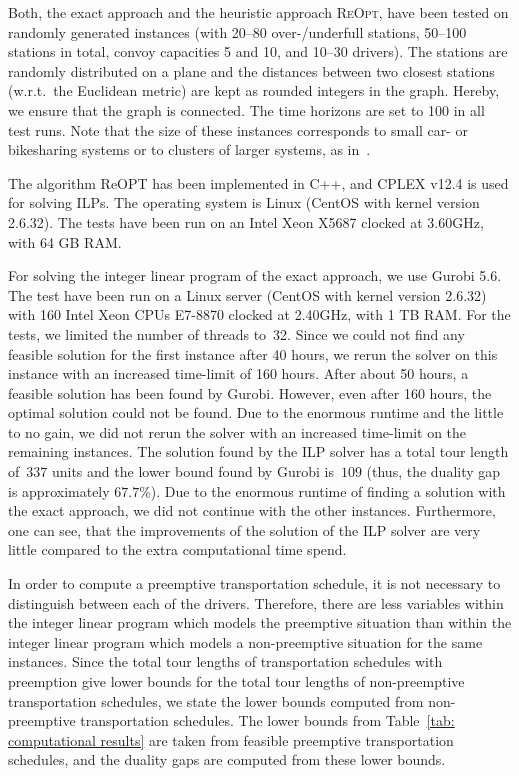 \documentclass[english]{llncs}
\numberwithin{sublemma}{lemma}
\newcommand{\REOPT}{\textsc{ReOpt}\xspace}
\begin{document}
Both, the exact approach and the heuristic approach \REOPT, have been tested on randomly generated instances (with 20--80 over-/underfull stations,
50--100 stations in total, convoy capacities 5 and 10, and 10--30 drivers).
The stations are randomly distributed on a plane and the distances between two closest stations (w.r.t.~the Euclidean metric) are kept as rounded integers in the graph.
Hereby, we ensure that the graph is connected.
The time horizons are set to 100 in all test runs.
Note that the size of these instances corresponds to small car- or bikesharing systems or to clusters of larger systems, as in~\cite{SHH-2013}.


The algorithm ReOPT has been implemented in C++, and CPLEX v12.4 is used for solving ILPs.
The operating system is Linux (CentOS with kernel version 2.6.32).
The tests have been run on an Intel Xeon X5687 clocked at 3.60GHz, with 64 GB RAM.


For solving the integer linear program of the exact approach, we use Gurobi 5.6.
The test have been run on a Linux server (CentOS with kernel version 2.6.32) with 160 Intel Xeon CPUs E7-8870 clocked at 2.40GHz, with 1 TB RAM.
For the tests, we limited the number of threads to~32.
Since we could not find any feasible solution for the first instance after 40 hours, we rerun the solver on this instance with an increased time-limit of 160 hours.
After about 50 hours, a feasible solution has been found by Gurobi.
However, even after 160 hours, the optimal solution could not be found.
Due to the enormous runtime and the little to no gain, we did not rerun the solver with an increased time-limit on the remaining instances.
The solution found by the ILP solver has a total tour length of~$337$ units and the lower bound found by Gurobi is~$109$ (thus, the duality gap is approximately $67.7$\%).
Due to the enormous runtime of finding a solution with the exact approach, we did not continue with the other instances.
Furthermore, one can see, that the improvements of the solution of the ILP solver are very little compared to the extra computational time spend.

In order to compute a preemptive transportation schedule, it is not necessary to distinguish between each of the drivers.
Therefore, there are less variables within the integer linear program which models the preemptive situation than within the integer linear program which models a non-preemptive situation for the same instances.
Since the total tour lengths of transportation schedules with preemption give lower bounds for the total tour lengths of non-preemptive transportation schedules,
we state the lower bounds computed from non-preemptive transportation schedules.
The lower bounds from Table~\ref{tab: computational results} are taken from feasible preemptive transportation schedules, and the duality gaps are computed from these lower bounds.
\end{document}
